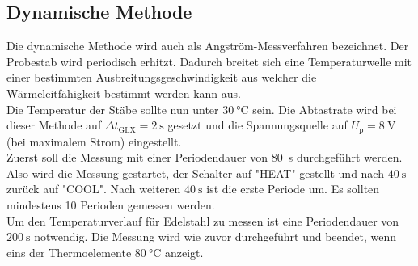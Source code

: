 \subsection{Dynamische Methode}
Die dynamische Methode wird auch als Angström-Messverfahren bezeichnet.
Der Probestab wird periodisch erhitzt.
Dadurch breitet sich eine Temperaturwelle mit einer bestimmten Ausbreitungsgeschwindigkeit aus welcher die Wärmeleitfähigkeit bestimmt werden kann aus.
\\
Die Temperatur der Stäbe sollte nun unter $\SI{30}{\celsius}$ sein.
Die Abtastrate wird bei dieser Methode auf $\Delta t_\text{GLX}=\SI{2}{\second}$ gesetzt und die Spannungsquelle auf $U_\text{p} = \SI{8}{\volt}$ (bei maximalem Strom) eingestellt.
\\
Zuerst soll die Messung mit einer Periodendauer von \SI{80}{\second} durchgeführt werden.
Also wird die Messung gestartet, der Schalter auf "HEAT" gestellt und nach $\SI{40}{\second}$ zurück auf "COOL".
Nach weiteren $\SI{40}{\second}$ ist die erste Periode um.
Es sollten mindestens 10 Perioden gemessen werden.
\\
Um den Temperaturverlauf für Edelstahl zu messen ist eine Periodendauer von $\SI{200}{\second}$ notwendig.
Die Messung wird wie zuvor durchgeführt und beendet, wenn eins der Thermoelemente $\SI{80}{\celsius}$ anzeigt.